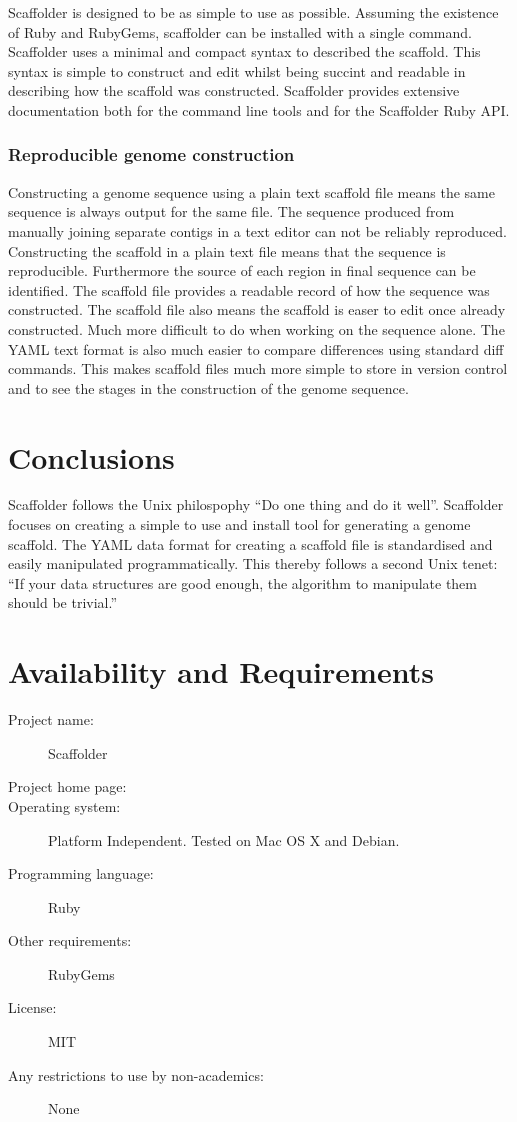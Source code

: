 \documentclass[10pt]{bmc_article}
\newenvironment{bmcformat}{\begin{raggedright}\baselineskip20pt\sloppy\setboolean{publ}{false}}{\end{raggedright}\baselineskip20pt\sloppy}
\begin{document}
\begin{bmcformat}
Scaffolder is designed to be as simple to use as possible. Assuming the
existence of Ruby and RubyGems, scaffolder can be installed with a single
command. Scaffolder uses a minimal and compact syntax to described the
scaffold. This syntax is simple to construct and edit whilst being succint and
readable in describing how the scaffold was constructed. Scaffolder provides
extensive documentation both for the command line tools and for the Scaffolder
Ruby API.

\subsubsection{Reproducible genome construction}

Constructing a genome sequence using a plain text scaffold file means the same
sequence is always output for the same file. The sequence produced from
manually joining separate contigs in a text editor can not be reliably
reproduced. Constructing the scaffold in a plain text file means that the
sequence is reproducible. Furthermore the source of each region in final
sequence can be identified. The scaffold file provides a readable record of
how the sequence was constructed. The scaffold file also means the scaffold is
easer to edit once already constructed. Much more difficult to do when working
on the sequence alone. The YAML text format is also much easier to compare
differences using standard diff commands. This makes scaffold files much more
simple to store in version control and to see the stages in the construction
of the genome sequence.

\section*{Conclusions} %

Scaffolder follows the Unix philospophy ``Do one thing and do it well''.
Scaffolder focuses on creating a simple to use and install tool for generating
a genome scaffold. The YAML data format for creating a scaffold file is
standardised and easily manipulated programmatically. This thereby follows
a second Unix tenet: ``If your data structures are good enough, the algorithm
to manipulate them should be trivial.''

\section*{Availability and Requirements} %

  \begin{description}
    \item[Project name:] Scaffolder
    \item[Project home page:] \scaffolder
    \item[Operating system:] Platform Independent. Tested on Mac OS X and
    Debian.
    \item[Programming language:] Ruby
    \item[Other requirements:] RubyGems
    \item[License:] MIT
    \item[Any restrictions to use by non-academics:] None
  \end{description}


\end{bmcformat}
\end{document}
